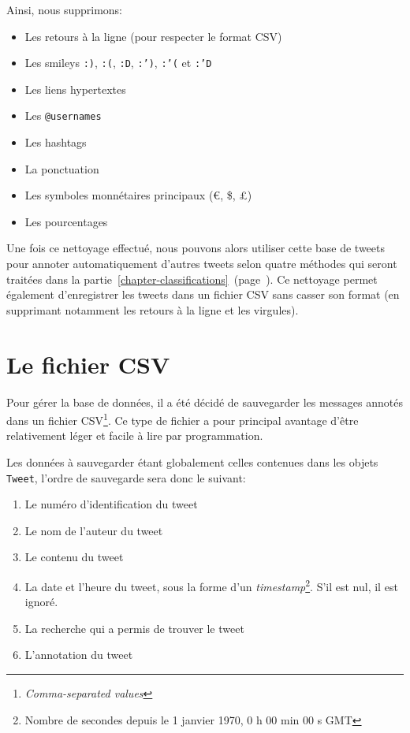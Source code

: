 \documentclass[12pt,a4paper]{report}
\begin{document}
Ainsi, nous supprimons:

\begin{itemize}
	\item
		Les retours à la ligne (pour respecter le format CSV)
	\item
		Les smileys \texttt{:)}, \texttt{:(}, \texttt{:D}, \texttt{:')},
		\texttt{:'(} et \texttt{:'D}
	\item
		Les liens hypertextes
	\item
		Les \texttt{@usernames}
	\item
		Les hashtags
	\item
		La ponctuation
	\item
		Les symboles monnétaires principaux (\euro, \$, £)
	\item
		Les pourcentages
\end{itemize}

Une fois ce nettoyage effectué, nous pouvons alors utiliser cette base de tweets
pour annoter automatiquement d'autres tweets selon quatre méthodes qui seront
traitées dans la
partie~\ref{chapter-classifications}~(page~\pageref{chapter-classifications}).
Ce nettoyage permet également d'enregistrer les tweets dans un fichier CSV sans
casser son format (en supprimant notamment les retours à la ligne et les
virgules).

\section{Le fichier CSV}

Pour gérer la base de données, il a été décidé de sauvegarder les messages
annotés dans un fichier CSV\footnote{\textit{Comma-separated values}}. Ce type
de fichier a pour principal avantage d'être relativement léger et facile à lire
par programmation.

Les données à sauvegarder étant globalement celles contenues dans les objets
\texttt{Tweet}, l'ordre de sauvegarde sera donc le suivant:

\begin{enumerate}
	\item
		Le numéro d'identification du tweet
	\item
		Le nom de l'auteur du tweet
	\item
		Le contenu du tweet
	\item
		La date et l'heure du tweet, sous la forme d'un
		\textit{timestamp}\footnote{Nombre de secondes depuis le 
		1\ier{} janvier 1970, 0 h 00 min 00 s GMT}. S'il est nul, il est
		ignoré.
	\item
		La recherche qui a permis de trouver le tweet
	\item
		L'annotation du tweet
\end{enumerate}
\end{document}
